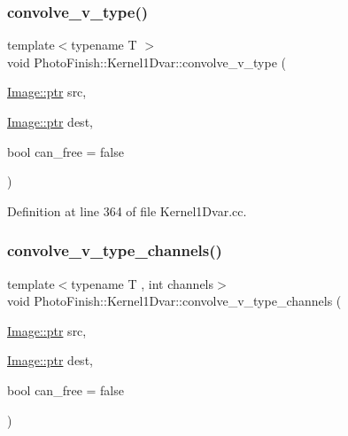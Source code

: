 \subsubsection{\texorpdfstring{convolve\+\_\+v\+\_\+type()}{convolve\_v\_type()}}
{\footnotesize\ttfamily template$<$typename T $>$ \\
void Photo\+Finish\+::\+Kernel1\+Dvar\+::convolve\+\_\+v\+\_\+type (\begin{DoxyParamCaption}\item[{\hyperlink{class_photo_finish_1_1_image_ab336203305ed3a1397d7245063353b5a}{Image\+::ptr}}]{src,  }\item[{\hyperlink{class_photo_finish_1_1_image_ab336203305ed3a1397d7245063353b5a}{Image\+::ptr}}]{dest,  }\item[{bool}]{can\+\_\+free = {\ttfamily false} }\end{DoxyParamCaption})\hspace{0.3cm}{\ttfamily [protected]}}



Definition at line 364 of file Kernel1\+Dvar.\+cc.

\mbox{\label{class_photo_finish_1_1_kernel1_dvar_ab566b386272be4da7254fb11565cb81d}} 
\subsubsection{\texorpdfstring{convolve\+\_\+v\+\_\+type\+\_\+channels()}{convolve\_v\_type\_channels()}}
{\footnotesize\ttfamily template$<$typename T , int channels$>$ \\
void Photo\+Finish\+::\+Kernel1\+Dvar\+::convolve\+\_\+v\+\_\+type\+\_\+channels (\begin{DoxyParamCaption}\item[{\hyperlink{class_photo_finish_1_1_image_ab336203305ed3a1397d7245063353b5a}{Image\+::ptr}}]{src,  }\item[{\hyperlink{class_photo_finish_1_1_image_ab336203305ed3a1397d7245063353b5a}{Image\+::ptr}}]{dest,  }\item[{bool}]{can\+\_\+free = {\ttfamily false} }\end{DoxyParamCaption})\hspace{0.3cm}{\ttfamily [protected]}}



